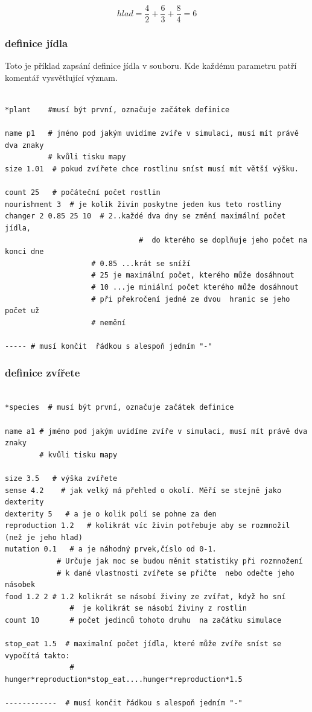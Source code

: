 \documentclass[10pt,a4paper]{article}
\begin{document}
$$hlad=\frac{4}{2}+ \frac{6}{3}+\frac{8}{4}=6$$ 

\subsubsection{definice jídla }
Toto je příklad zapsání definice jídla v souboru. Kde každému parametru patří komentář vysvětlující význam.

\begin{verbatim}

*plant    #musí být první, označuje začátek definice

name p1   # jméno pod jakým uvidíme zvíře v simulaci, musí mít právě dva znaky
		  # kvůli tisku mapy
size 1.01  # pokud zvířete chce rostlinu sníst musí mít větší výšku.

count 25   # počáteční počet rostlin
nourishment 3  # je kolik živin poskytne jeden kus teto rostliny
changer 2 0.85 25 10  # 2..každé dva dny se změní maximální počet jídla,
				               #  do kterého se doplňuje jeho počet na konci dne 
					# 0.85 ...krát se sníží 
					# 25 je maximální počet, kterého může dosáhnout
					# 10 ...je miniální počet kterého může dosáhnout
					# při překročení jedné ze dvou  hranic se jeho počet už 
					# nemění

----- # musí končit  řádkou s alespoň jedním "-"
\end{verbatim}

\subsubsection{definice zvířete}

\begin{verbatim}

*species  # musí být první, označuje začátek definice

name a1 # jméno pod jakým uvidíme zvíře v simulaci, musí mít právě dva znaky
        # kvůli tisku mapy

size 3.5   # výška zvířete
sense 4.2    # jak velký má přehled o okolí. Měří se stejně jako dexterity 
dexterity 5   # a je o kolik polí se pohne za den
reproduction 1.2   # kolikrát víc živin potřebuje aby se rozmnožil (než je jeho hlad)
mutation 0.1   # a je náhodný prvek,číslo od 0-1.
            # Určuje jak moc se budou měnit statistiky při rozmnožení
            # k dané vlastnosti zvířete se přičte  nebo odečte jeho násobek 
food 1.2 2 # 1.2 kolikrát se násobí živiny ze zvířat, když ho sní
			   #  je kolikrát se násobí živiny z rostlin
count 10	   # počet jedinců tohoto druhu  na začátku simulace 
 
stop_eat 1.5  # maximalní počet jídla, které může zvíře sníst se vypočítá takto:
               #  hunger*reproduction*stop_eat....hunger*reproduction*1.5
               
------------  # musí končit řádkou s alespoň jedním "-"

\end{verbatim}
\end{document}
